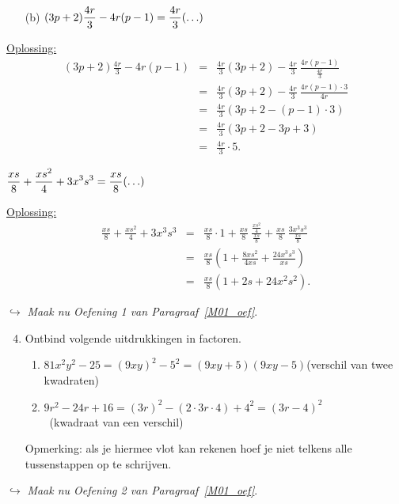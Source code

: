 \documentclass{ximera}
\begin{document}
\begin{enumerate}
\begin{enumerate}
\item[(b)]
$\displaystyle{(3p+2)\frac{4r}{3}-4r(p-1)=\frac{4r}{3}(\ldots)}$
\end{enumerate}

\underline{Oplossing:}
\begin{eqnarray*}
(3p+2)\frac{4r}{3}-4r(p-1)&=&\frac{4r}{3}(3p+2)-\frac{4r}{3}\ \frac{4r(p-1)}{\frac{4r}{3}}\\
&=&\frac{4r}{3}(3p+2)-\frac{4r}{3}\ \frac{4r(p-1)\cdot3}{4r}\\
&=&\frac{4r}{3}(3p+2-(p-1)\cdot3)\\
&=&\frac{4r}{3}(3p+2-3p+3)\\
&=&\frac{4r}{3}\cdot5.
\end{eqnarray*}


\begin{example}
$\displaystyle{\frac{xs}{8}+\frac{xs^{2}}{4}+3x^{3}s^{3}=\frac{xs}{8}(\ldots)}$

\begin{feedback}
\underline{Oplossing:}
\begin{eqnarray*}
\frac{xs}{8}+\frac{xs^{2}}{4}+3x^{3}s^{3}&=&\frac{xs}{8}\cdot1+\frac{xs}{8}\ \frac{\frac{xs^{2}}{4}}{\frac{xs}{8}}+\frac{xs}{8}\ \frac{3x^{3}s^{3}}{\frac{xs}{8}}\\
&=&\frac{xs}{8}\left(1+\frac{8xs^{2}}{4xs}+\frac{24x^{3}s^{3}}{xs}\right)\\
&=&\frac{xs}{8}(1+2s+24x^{2}s^{2}).
\end{eqnarray*}
\end{feedback}
\end{example}
\end{enumerate}
$\hookrightarrow$ \textit{Maak nu Oefening 1 van
Paragraaf~\ref{M01_oef}}.
\begin{enumerate}
\setcounter{enumi}{3}
\item Ontbind volgende uitdrukkingen in factoren.
\begin{enumerate}
\item $81x^{2}y^{2}-25=(9xy)^{2}-5^{2}=(9xy+5)(9xy-5)$\hfill(verschil van twee kwadraten)
\item $9r^{2 }-24r+16=(3r)^{2}-(2\cdot3r\cdot4)+4^{2}=(3r-4)^{2}$\\\mbox{\ }\hfill(kwadraat van een verschil)
\end{enumerate}
Opmerking: als je hiermee vlot kan rekenen hoef je niet telkens alle
tussenstappen op te schrijven.
\end{enumerate}
$\hookrightarrow$ \textit{Maak nu Oefening 2 van Paragraaf~\ref{M01_oef}}.
\end{document}
